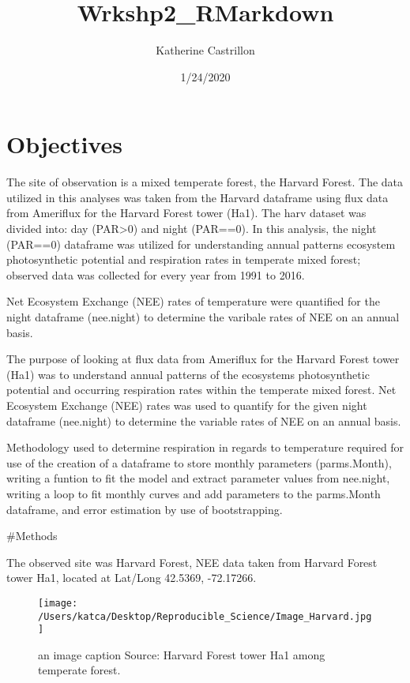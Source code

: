 \documentclass[
]{article}
\title{Wrkshp2\_RMarkdown}
\author{Katherine Castrillon}
\date{1/24/2020}
\begin{document}
\maketitle

\hypertarget{objectives}{%
\section{Objectives}\label{objectives}}

The site of observation is a mixed temperate forest, the Harvard Forest.
The data utilized in this analyses was taken from the Harvard dataframe
using flux data from Ameriflux for the Harvard Forest tower (Ha1). The
harv dataset was divided into: day (PAR\textgreater0) and night
(PAR==0). In this analysis, the night (PAR==0) dataframe was utilized
for understanding annual patterns ecosystem photosynthetic potential and
respiration rates in temperate mixed forest; observed data was collected
for every year from 1991 to 2016.

Net Ecosystem Exchange (NEE) rates of temperature were quantified for
the night dataframe (nee.night) to determine the varibale rates of NEE
on an annual basis.

The purpose of looking at flux data from Ameriflux for the Harvard
Forest tower (Ha1) was to understand annual patterns of the ecosystems
photosynthetic potential and occurring respiration rates within the
temperate mixed forest. Net Ecosystem Exchange (NEE) rates was used to
quantify for the given night dataframe (nee.night) to determine the
variable rates of NEE on an annual basis.

Methodology used to determine respiration in regards to temperature
required for use of the creation of a dataframe to store monthly
parameters (parms.Month), writing a funtion to fit the model and extract
parameter values from nee.night, writing a loop to fit monthly curves
and add parameters to the parms.Month dataframe, and error estimation by
use of bootstrapping.

\#Methods

The observed site was Harvard Forest, NEE data taken from Harvard Forest
tower Ha1, located at Lat/Long 42.5369, -72.17266.

\begin{figure}
\centering
\texttt{[image: /Users/katca/Desktop/Reproducible\_Science/Image\_Harvard.jpg]}
\caption{an image caption Source: Harvard Forest tower Ha1 among
temperate forest.}
\end{figure}
\end{document}
